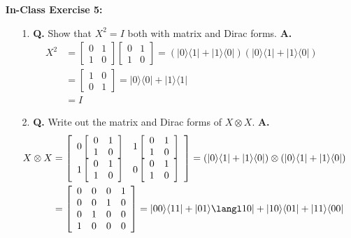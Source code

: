 \documentclass[main.tex]{subfiles}
\begin{document}
\begin{enumerate}
\item[] \textbf{In-Class Exercise 5:}
\begin{enumerate}
    \item[1.] \textbf{Q.} Show that $X^{2}=I$ both with matrix and Dirac forms. \textbf{A.}
    \begin{align*}
        X^2 & = \left[\begin{array}{ll}0&1\\1&0\end{array}\right]
            \left[\begin{array}{ll}0&1\\1&0\end{array}\right]
            = (|0\rangle\langle1| + |1\rangle\langle0|)(|0\rangle\langle1| + |1\rangle\langle0|)\\
            & = \left[\begin{array}{ll}1&0\\0&1\end{array}\right] 
            = |0\rangle\langle0| + |1\rangle\langle1|\\
            & = I
    \end{align*}
    \item[2.] \textbf{Q.} Write out the matrix and Dirac forms of $X \otimes X$. \textbf{A.}
    \begin{align*}
        X \otimes X & = \left[\begin{array}{ll} 0 \left[\begin{array}{ll}0&1\\1&0\end{array}\right] & 
                    1 \left[\begin{array}{ll}0&1\\1&0\end{array}\right] \\
                    1 \left[\begin{array}{ll}0&1\\1&0\end{array}\right] &
                    0 \left[\begin{array}{ll}0&1\\1&0\end{array}\right] \end{array} \right]
                    = (|0\rangle\langle1| + |1\rangle\langle0|) \otimes (|0\rangle\langle1| + |1\rangle\langle0|)\\
                    & = \left[\begin{array}{llll}0&0&0&1\\0&0&1&0\\0&1&0&0\\1&0&0&0\end{array}\right]
                    = |00\rangle\langle11| + |01\rangle\langl10| + |10\rangle\langle01| + |11\rangle\langle00|
    \end{align*}
\end{enumerate}


\end{enumerate}
\end{document}
